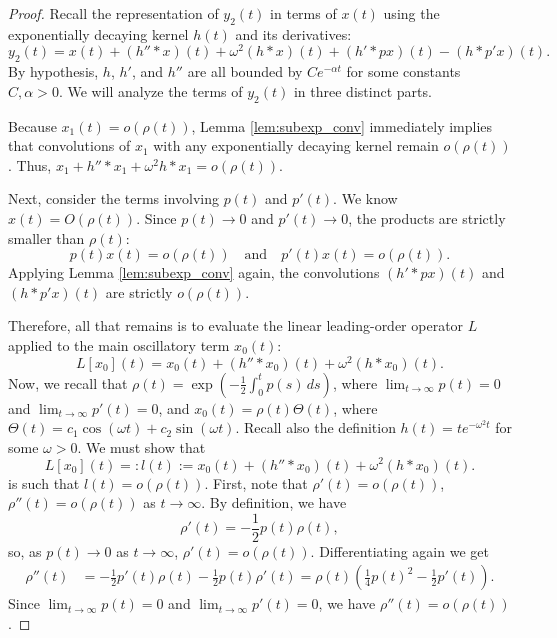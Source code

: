 \documentclass[10pt,a4paper]{amsart}
\begin{document}
	\begin{proof}
		Recall the representation of $y_2(t)$ in terms of $x(t)$ using the exponentially decaying kernel $h(t)$ and its derivatives:
		\[ y_2(t) = x(t) + (h'' * x)(t) + \omega^2(h * x)(t) + (h' * px)(t) - (h * p'x)(t). \]
		By hypothesis, $h$, $h'$, and $h''$ are all bounded by $C e^{-\alpha t}$ for some constants $C, \alpha > 0$. We will analyze the terms of $y_2(t)$ in three distinct parts.
		
		Because $x_1(t) = o(\rho(t))$, Lemma \ref{lem:subexp_conv} immediately implies that convolutions of $x_1$ with any exponentially decaying kernel remain $o(\rho(t))$. Thus, $x_1 + h'' * x_1 + \omega^2 h * x_1 = o(\rho(t))$.
		
		Next, consider the terms involving $p(t)$ and $p'(t)$. We know $x(t) = O(\rho(t))$. Since $p(t) \to 0$ and $p'(t) \to 0$, the products are strictly smaller than $\rho(t)$:
		\[ p(t)x(t) = o(\rho(t)) \quad \text{and} \quad p'(t)x(t) = o(\rho(t)). \]
		Applying Lemma \ref{lem:subexp_conv} again, the convolutions $(h' * px)(t)$ and $(h * p'x)(t)$ are strictly $o(\rho(t))$. 
		
		Therefore, all that remains is to evaluate the linear leading-order operator $L$ applied to the main oscillatory term $x_0(t)$:
		\[ L[x_0](t) = x_0(t) + (h'' * x_0)(t) + \omega^2 (h * x_0)(t). \]	
		Now, we recall that  $\rho(t) = \exp\left(-\frac{1}{2}\int_0^t p(s)\,ds\right)$, where $\lim_{t \to \infty} p(t) = 0$ and $\lim_{t \to \infty} p'(t) = 0$, and  $x_0(t) = \rho(t)\Theta(t)$, where $\Theta(t) = c_1 \cos(\omega t) + c_2 \sin(\omega t)$. Recall also the definition 
	   $h(t) = t e^{-\omega^2 t}$ for some $\omega > 0$. We must show that 
\[ L[x_0](t)=: l(t) := x_0(t) + (h'' * x_0)(t) + \omega^2 (h * x_0)(t).
\]
is such that $l(t)=o(\rho(t))$. 
First, note that 			
$\rho'(t) = o(\rho(t))$, $\rho''(t) = o(\rho(t))$ as $t \to \infty$. By definition, we have 
\[ \rho'(t) = %
-\frac{1}{2}p(t)\rho(t), \]
so, as $p(t)\to 0$ as $t\to\infty$, $\rho'(t)=o(\rho(t))$. 
Differentiating again we get 	
			\begin{align*}
				\rho''(t) &= -\frac{1}{2}p'(t)\rho(t) - \frac{1}{2}p(t)\rho'(t) = \rho(t) \left( \frac{1}{4}p(t)^2 - \frac{1}{2}p'(t) \right).
			\end{align*}
			Since $\lim_{t \to \infty} p(t) = 0$ and $\lim_{t \to \infty} p'(t) = 0$, we have  $\rho''(t) = o(\rho(t))$. 
			

\end{proof}
\end{document}
